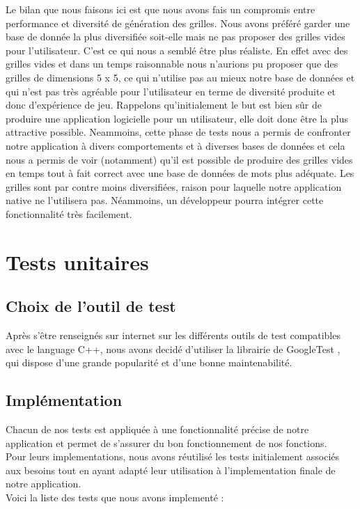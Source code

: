 \documentclass [ 11 pt ] {article}
\begin{document}
    Le bilan que nous faisons ici est que nous avons fais un compromis entre performance et diversité de génération des grilles. Nous avons préféré garder une base de donnée la plus diversifiée soit-elle mais ne pas proposer des grilles vides pour l'utilisateur. C'est ce qui nous a semblé être plus réaliste. En effet avec des grilles vides et dans un temps raisonnable nous n'aurions pu proposer que des grilles de dimensions 5 x 5, ce qui n'utilise pas au mieux notre base de données et qui n'est pas très agréable pour l'utilisateur en terme de diversité produite et donc d'expérience de jeu. Rappelons qu'initialement le but est bien sûr de produire une application logicielle pour un utilisateur, elle doit donc être la plus attractive possible. Neammoins, cette phase de tests nous a permis de confronter notre application à divers comportements et à diverses bases de données et cela nous a permis de voir (notamment) qu'il est possible de produire des grilles vides en temps tout à fait correct avec une base de données de mots plus adéquate. Les grilles sont par contre moins diversifiées, raison pour laquelle notre application native ne l'utilisera pas. Néammoins, un développeur pourra intégrer cette fonctionnalité très facilement. 

\newpage
\section{Tests unitaires}
\subsection{Choix de l'outil de test}
Après s'être renseignés sur internet sur les différents outils de test compatibles avec le language C++, nous avons decidé d'utiliser la librairie de GoogleTest \cite{Gt}, qui dispose d'une grande popularité et d'une bonne maintenabilité.

\subsection{Implémentation}
Chacun de nos tests est appliquée à une fonctionnalité précise de notre application et permet de s'assurer du bon fonctionnement de nos fonctions.\\
Pour leurs implementations, nous avons réutilisé les tests initialement associés aux besoins tout en ayant adapté leur utilisation à l'implementation finale de notre application.
\\
Voici la liste des tests que nous avons implementé :\\
\end{document}
